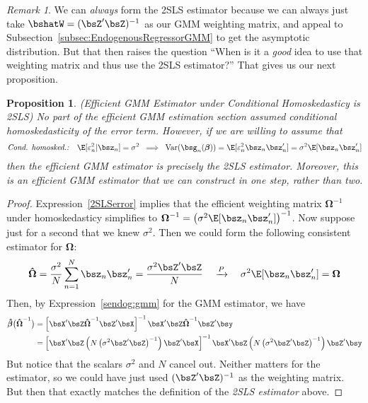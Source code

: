 \documentclass[12pt]{article}
\theoremstyle{plain}
\newtheorem{prop}[thm]{Proposition}
\theoremstyle{definition}
\theoremstyle{remark}
\newtheorem*{rmk}{Remark}
\newcommand{\bsbeta}{\boldsymbol{\beta}}
\newcommand{\bsOmega}{\boldsymbol{\Omega}}
\newcommand{\bshatbeta}{\boldsymbol{\hat{\beta}}}
\newcommand{\bshatOmega}{\boldsymbol{\hat{\Omega}}}
\newcommand{\Var}{\operatorname{Var}}
\newcommand{\pto}{\xrightarrow{P}}
\newcommand{\sumnN}{\sum^N_{n=1}}
\begin{document}
\begin{rmk}
We can \emph{always} form the 2SLS estimator because we can always just
take $\bshatW=(\bsZ'\bsZ)^{-1}$ as our GMM weighting matrix, and appeal
to Subsection~\ref{subsec:EndogenousRegressorGMM} to get the asymptotic
distribution.  But that then raises the question ``When is it a
\emph{good} idea to use that weighting matrix and thus use the 2SLS
estimator?'' That gives us our next proposition.
\end{rmk}


\begin{prop}
\emph{%
  (Efficient GMM Estimator under Conditional Homoskedasticy is 2SLS)}
No part of the efficient GMM estimation section assumed conditional
homoskedasticity of the error term. However, if we are willing to assume
that
\begin{align}
  \text{\emph{Cond. homosked.:}}\quad
  \E[\varepsilon_n^2|\bsz_n] = \sigma^2
  \;\implies\;
  \Var(\bsg_n(\bsbeta))=
  \E[\varepsilon_n^2\bsz_n\bsz_n']
  = \sigma^2 \E[\bsz_n\bsz_n']
  \label{2SLSerror}
\end{align}
then the efficient GMM estimator is precisely the 2SLS estimator.
Moreover, this is an efficient GMM estimator that we can construct in
one step, rather than two.
\end{prop}

\begin{proof}
Expression~\ref{2SLSerror} implies that the efficient weighting matrix
$\bsOmega^{-1}$ under homoskedasticy simplifies to
$\bsOmega^{-1}=\left(\sigma^2 \E[\bsz_n\bsz_n']\right)^{-1}$.
Now suppose just for a second that we knew $\sigma^2$. Then we could
form the following consistent estimator for $\bsOmega$:
\begin{align*}
  \bshatOmega
  = \frac{\sigma^2}{N} \sumnN \bsz_n\bsz_n'
  = \frac{\sigma^2\bsZ'\bsZ}{N}
  \quad\pto\quad
  \sigma^2 \E[\bsz_n\bsz_n']
  = \bsOmega
\end{align*}
Then, by Expression~\ref{sendog:gmm} for the GMM estimator, we have
\begin{align*}
  \bshatbeta\big(
  \bshatOmega^{-1}
  \big)
  &=
  \left[
  \bsX'\bsZ
  \bshatOmega^{-1}
  \bsZ'\bsX
  \right]^{-1}
  \bsX'\bsZ
  \bshatOmega^{-1}
  \bsZ'\bsy
  \\
  &=
  \left[
  \bsX'\bsZ
    \left(N\left(\sigma^2 \bsZ'\bsZ\right)^{-1}\right)
  \bsZ'\bsX
  \right]^{-1}
  \bsX'\bsZ\left(N\left(\sigma^2 \bsZ'\bsZ\right)^{-1}\right)\bsZ'\bsy
\end{align*}
But notice that the scalars $\sigma^2$ and $N$ cancel out. Neither
matters for the estimator, so we could have just used $(\bsZ'\bsZ)^{-1}$
as the weighting matrix. But then that exactly matches the definition of
the \emph{2SLS estimator} above.
\end{proof}
\end{document}
